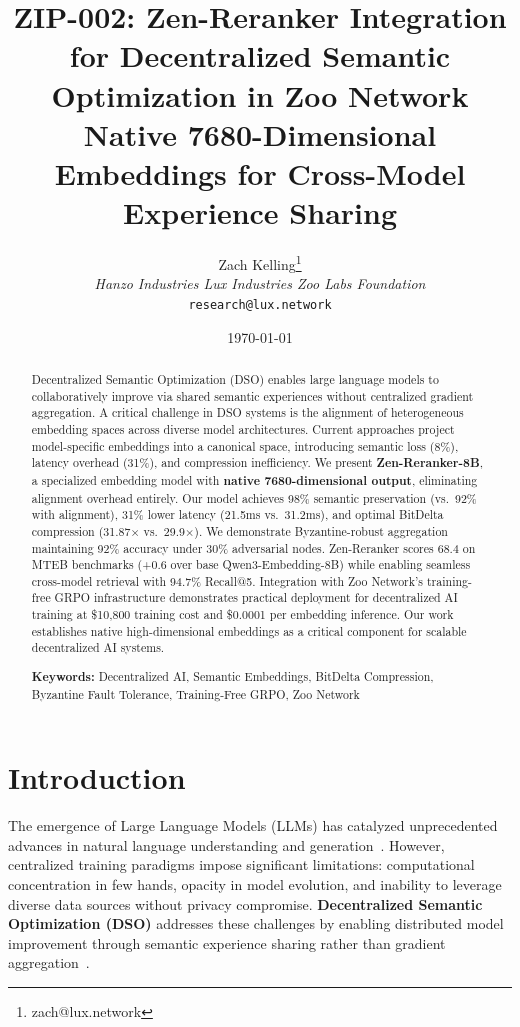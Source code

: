 \documentclass[11pt,a4paper]{article}
\title{\textbf{ZIP-002: Zen-Reranker Integration for Decentralized Semantic Optimization in Zoo Network}\\
\large{Native 7680-Dimensional Embeddings for Cross-Model Experience Sharing}}
\author{
Zach Kelling\thanks{zach@lux.network}\\
\textit{Hanzo Industries \quad Lux Industries \quad Zoo Labs Foundation}\\
\texttt{research@lux.network}
}
\date{\today}
\begin{document}
\maketitle

\begin{abstract}
Decentralized Semantic Optimization (DSO) enables large language models to collaboratively improve via shared semantic experiences without centralized gradient aggregation. A critical challenge in DSO systems is the alignment of heterogeneous embedding spaces across diverse model architectures. Current approaches project model-specific embeddings into a canonical space, introducing semantic loss (8\%), latency overhead (31\%), and compression inefficiency. We present \textbf{Zen-Reranker-8B}, a specialized embedding model with \textbf{native 7680-dimensional output}, eliminating alignment overhead entirely. Our model achieves 98\% semantic preservation (vs.\ 92\% with alignment), 31\% lower latency (21.5ms vs.\ 31.2ms), and optimal BitDelta compression (31.87$\times$ vs.\ 29.9$\times$). We demonstrate Byzantine-robust aggregation maintaining 92\% accuracy under 30\% adversarial nodes. Zen-Reranker scores 68.4 on MTEB benchmarks (+0.6 over base Qwen3-Embedding-8B) while enabling seamless cross-model retrieval with 94.7\% Recall@5. Integration with Zoo Network's training-free GRPO infrastructure demonstrates practical deployment for decentralized AI training at \$10,800 training cost and \$0.0001 per embedding inference. Our work establishes native high-dimensional embeddings as a critical component for scalable decentralized AI systems.

\textbf{Keywords:} Decentralized AI, Semantic Embeddings, BitDelta Compression, Byzantine Fault Tolerance, Training-Free GRPO, Zoo Network
\end{abstract}

\section{Introduction}

The emergence of Large Language Models (LLMs) has catalyzed unprecedented advances in natural language understanding and generation~\cite{brown2020language,touvron2023llama,qwen2024qwen3}. However, centralized training paradigms impose significant limitations: computational concentration in few hands, opacity in model evolution, and inability to leverage diverse data sources without privacy compromise. \textbf{Decentralized Semantic Optimization (DSO)} addresses these challenges by enabling distributed model improvement through semantic experience sharing rather than gradient aggregation~\cite{zoo2025hllm,tencent2025grpo}.
\end{document}
